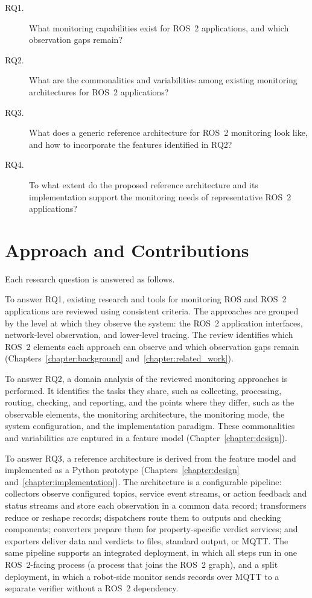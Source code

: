 \begin{description}
  \item[RQ1.] What monitoring capabilities exist for ROS~2 applications, 
  and which observation gaps remain?

  \item[RQ2.] What are the commonalities and variabilities 
  among existing monitoring architectures for ROS~2 applications?

  \item[RQ3.] What does a generic reference architecture
  for ROS~2 monitoring look like, and how to
  incorporate the features identified in RQ2?

  \item[RQ4.] To what extent do the proposed reference architecture and its
  implementation support the monitoring needs of representative ROS~2
  applications?
\end{description}

\section{Approach and Contributions}

Each research question is answered as follows.

To answer RQ1, existing research and tools for monitoring ROS and ROS~2
applications are reviewed using consistent criteria. The approaches are
grouped by the level at which they observe the system: the ROS~2 application
interfaces, network-level observation, and lower-level tracing. The review
identifies which ROS~2 elements each approach can observe and which
observation gaps remain (Chapters~\ref{chapter:background}
and~\ref{chapter:related_work}).

To answer RQ2, a domain analysis of the reviewed monitoring approaches is
performed. It identifies the tasks they share, such as collecting, processing,
routing, checking, and reporting, and the points where they differ, such as
the observable elements, the monitoring architecture, the monitoring mode, the
system configuration, and the implementation paradigm. These commonalities and
variabilities are captured in a feature model (Chapter~\ref{chapter:design}).

To answer RQ3, a reference architecture is derived from the feature model and
implemented as a Python prototype (Chapters~\ref{chapter:design}
and~\ref{chapter:implementation}). The architecture is a configurable
pipeline: collectors observe configured topics, service event streams, or
action feedback and status streams and store each observation in a common data
record; transformers reduce or reshape records; dispatchers route them to
outputs and checking components; converters prepare them for property-specific
verdict services; and exporters deliver data and verdicts to files, standard
output, or MQTT. The same pipeline supports an integrated deployment, in which
all steps run in one ROS~2-facing process (a process that joins the ROS~2
graph), and a split deployment, in which a robot-side monitor sends records
over MQTT to a separate verifier without a ROS~2 dependency.

